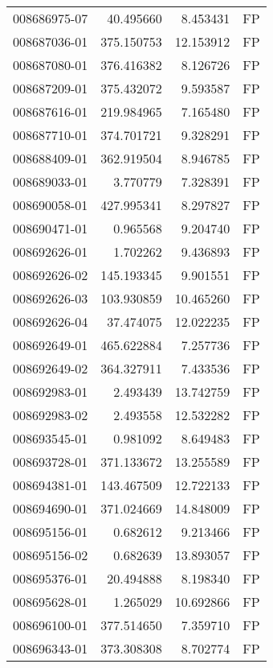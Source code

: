 \begin{tabular}{lrrl}
008686975-07 &   40.495660 &       8.453431 &   FP \\
008687036-01 &  375.150753 &      12.153912 &   FP \\
008687080-01 &  376.416382 &       8.126726 &   FP \\
008687209-01 &  375.432072 &       9.593587 &   FP \\
008687616-01 &  219.984965 &       7.165480 &   FP \\
008687710-01 &  374.701721 &       9.328291 &   FP \\
008688409-01 &  362.919504 &       8.946785 &   FP \\
008689033-01 &    3.770779 &       7.328391 &   FP \\
008690058-01 &  427.995341 &       8.297827 &   FP \\
008690471-01 &    0.965568 &       9.204740 &   FP \\
008692626-01 &    1.702262 &       9.436893 &   FP \\
008692626-02 &  145.193345 &       9.901551 &   FP \\
008692626-03 &  103.930859 &      10.465260 &   FP \\
008692626-04 &   37.474075 &      12.022235 &   FP \\
008692649-01 &  465.622884 &       7.257736 &   FP \\
008692649-02 &  364.327911 &       7.433536 &   FP \\
008692983-01 &    2.493439 &      13.742759 &   FP \\
008692983-02 &    2.493558 &      12.532282 &   FP \\
008693545-01 &    0.981092 &       8.649483 &   FP \\
008693728-01 &  371.133672 &      13.255589 &   FP \\
008694381-01 &  143.467509 &      12.722133 &   FP \\
008694690-01 &  371.024669 &      14.848009 &   FP \\
008695156-01 &    0.682612 &       9.213466 &   FP \\
008695156-02 &    0.682639 &      13.893057 &   FP \\
008695376-01 &   20.494888 &       8.198340 &   FP \\
008695628-01 &    1.265029 &      10.692866 &   FP \\
008696100-01 &  377.514650 &       7.359710 &   FP \\
008696343-01 &  373.308308 &       8.702774 &   FP \\

\end{tabular}
